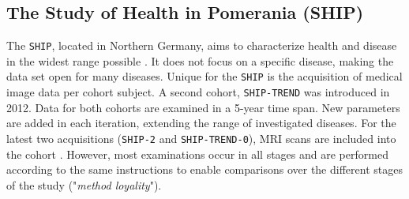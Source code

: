 \documentclass[journal]{style/vgtc} 			          %
\begin{document}
\subsection{The Study of Health in Pomerania (SHIP)}
The \texttt{SHIP}, located in Northern Germany, aims to characterize health and disease in the widest range possible \cite{Volzke2011}.
It does not focus on a specific disease, making the data set open for many diseases.
Unique for the \texttt{SHIP} is the acquisition of medical image data per cohort subject.
A second cohort, \texttt{SHIP-TREND} was introduced in 2012.
Data for both cohorts are examined in a 5-year time span.
New parameters are added in each iteration, extending the range of investigated diseases.
For the latest two acquisitions (\texttt{SHIP-2} and \texttt{SHIP-TREND-0}), MRI scans are included into the cohort \cite{Hegenscheid2009, Ivanovska2014}.
However, most examinations occur in all stages and are performed according to the same instructions to enable comparisons over the different stages of the study ("\emph{method loyality}").
%
%
%
%
%
%
\end{document}
